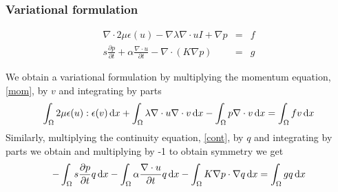 \begin{frame}
\frametitle{Variational formulation}
\begin{eqnarray}
\label{mom}
 \nabla\cdot 2 \mu \epsilon(u) - \nabla \lambda \nabla \cdot u I + \nabla p &=& f \\   
\label{cont}
s \frac{\partial p}{\partial t} + \alpha \frac{\nabla \cdot u}{\partial t} - \nabla \cdot (K \nabla p) &=& g 
\end{eqnarray}

We obtain a variational formulation by multiplying the momentum equation, \eqref{mom}, by $v$ and integrating by parts
\[ 
\int_\Omega 2 \mu \epsilon(u) : \epsilon(v) \, \mathrm{d}x + 
\int_\Omega \lambda  \nabla \cdot u \nabla \cdot v \, \mathrm{d}x -
\int_\Omega p \nabla \cdot v \, \mathrm{d}x = 
\int_\Omega f v \, \mathrm{d}x 
\]
Similarly, multiplying the continuity equation, \eqref{cont}, by $q$ and integrating by parts we obtain 
and multiplying by -1 to obtain symmetry we get 
\[
-\int_\Omega s \frac{\partial p}{\partial t} q \, \mathrm{d}x - 
\int_\Omega \alpha \frac{\nabla \cdot u}{\partial t} q \, \mathrm{d}x - 
\int_\Omega K \nabla p \cdot \nabla q \, \mathrm{d}x = 
\int_\Omega g q \, \mathrm{d}x 
\]

\end{frame}


